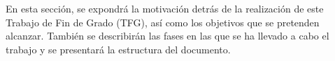 En esta sección, se expondrá la motivación detrás de la realización de este Trabajo de Fin de Grado (TFG), así como los objetivos que se pretenden alcanzar. También se describirán las fases en las que se ha llevado a cabo el trabajo y se presentará la estructura del documento.